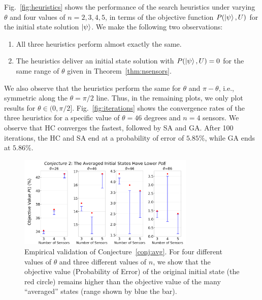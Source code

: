 





Fig.~\ref{fig:heuristics} shows the performance of the search heuristics
under varying $\theta$ and four values of $n = 2, 3, 4, 5$, in terms of the \iso objective function $P(\ket{\psi}, U)$ for the initial state solution $\ket{\psi}$. We make the following two observations:
\begin{enumerate}
    \item All three heuristics perform almost exactly the same.
    \item The heuristics deliver an initial state solution with $P(\ket{\psi}, U) = 0$ for the same range of $\theta$ given in Theorem~\ref{thm:nsensors}.
\end{enumerate}
We also observe that the heuristics perform the same for $\theta$ and $\pi - \theta$,
i.e., symmetric along the $\theta=\pi/2$ line. Thus, in the remaining plots, we only plot
results for $\theta \in (0, \pi/2]$.
Fig.~\ref{fig:iterations} shows the convergence rates of the three heuristics for a specific value of $\theta=46$ degrees and $n=4$ sensors. 
We observe that HC converges the fastest, followed by SA and GA.
After 100 iterations, the HC and SA end at a probability of error of $5.85\%$, while GA ends at $5.86\%$.



\begin{figure}[ht]
    \centering
    \includegraphics[width=0.75\textwidth]{chapters/tqc/figures/lemma2.png}
    \caption{Empirical validation of Conjecture~\ref{conj:avg}. For four different values of $\theta$ and three different values of $n$, we show that
    the objective value (Probability of Error) of the original initial state (the red circle) remains higher than the objective value of the many ``averaged'' states (range shown by blue the bar).}
    \label{fig:lemma2}
\end{figure}



